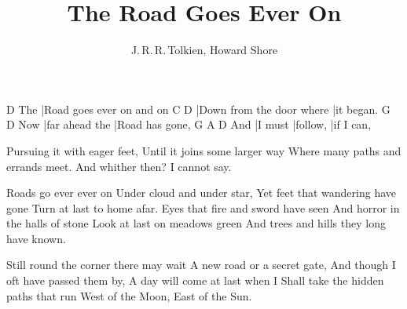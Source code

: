 \documentclass{song}
\author{J.\,R.\,R.\,Tolkien, Howard Shore}
\title{The Road Goes Ever On}
\begin{document}

\strophe
    D
The |Road goes ever on and on
C                         D
|Down from the door where |it began.
    G              D
Now |far ahead the |Road has gone,
    G       A        D
And |I must |follow, |if I can,
\endstrophe

\strophe*
Pursuing it with eager feet,
Until it joins some larger way
Where many paths and errands meet.
And whither then? I cannot say. 
\endstrophe

\strophe*
Roads go ever ever on
Under cloud and under star,
Yet feet that wandering have gone
Turn at last to home afar.
Eyes that fire and sword have seen
And horror in the halls of stone
Look at last on meadows green
And trees and hills they long have known. 
\endstrophe

\strophe*
Still round the corner there may wait
A new road or a secret gate,
And though I oft have passed them by,
A day will come at last when I
Shall take the hidden paths that run
West of the Moon, East of the Sun. 
\endstrophe
\end{document}
